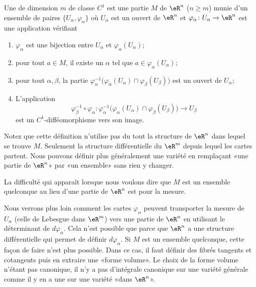 \begin{definition}
    Une  de dimension \( m\) de classe \( C^1\) est une partie \( M\) de \( \eR^n\) (\( n\geq m\)) munie d'un ensemble de paires \( \{ U_{\alpha},\varphi_{\alpha} \}\) où \( U_{\alpha}\) est un ouvert de \( \eR^n\) et \( \varphi_{\alpha}\colon U_{\alpha}\to \eR^n\) est une application vérifiant
    \begin{enumerate}
        \item
            \( \varphi_{\alpha}\) est une bijection entre \( U_{\alpha}\) et \( \varphi_{\alpha}(U_{\alpha})\);
        \item
            pour tout \( a\in M\), il existe un \( \alpha\) tel que \( a\in\varphi_{\alpha}(U_{\alpha})\);
        \item
            pour tout \( \alpha,\beta\), la partie \( \varphi_{\alpha}^{-1}\big( \varphi_{\alpha}(U_{\alpha})\cap \varphi_{\beta}(U_{\beta}) \big)\) est un ouvert de \( U_{\alpha}\);
        \item
            L'application
            \begin{equation}
                \varphi_{\beta}^{-1}\circ \varphi_{\alpha}\colon \varphi_{\alpha}^{-1}\big( \varphi_{\alpha}(U_{\alpha})\cap \varphi_{\beta}(U_{\beta}) \big)\to U_{\beta}
            \end{equation}
            est un \( C^1\)-difféomorphisme vers son image.
    \end{enumerate}
\end{definition}

Notez que cette définition n'utilise pas du tout la structure de \( \eR^n\) dans lequel se trouve \( M\). Seulement la structure différentielle du \( \eR^m\) depuis lequel les cartes partent. Nous pouvons définir plus généralement une variété en remplaçant «une partie de \( \eR^n\)» par «un ensemble» sans rien y changer.

La difficulté qui apparaît lorsque nous voulons dire que \( M\) est un ensemble quelconque au lieu d'une partie de \( \eR^n\) est pour la mesure.

Nous verrons plus loin comment les cartes \( \varphi_{\alpha}\) peuvent transporter la mesure de \( U_{\alpha}\) (celle de Lebesgue dans \( \eR^m\)) vers une partie de \( \eR^n\) en utilisant le déterminant de \( d\varphi_{\alpha}\). Cela n'est possible que parce que \( \eR^n\) a une structure différentielle qui permet de définir \( d\varphi_{\alpha}\). Si \( M\) est un ensemble quelconque, cette façon de faire n'est plus possible. Dans ce cas, il faut définir des fibrés tangents et cotangents puis en extraire une «forme volume». Le choix de la forme volume n'étant pas canonique, il n'y a pas d'intégrale canonique sur une variété générale comme il y en a une sur une variété «dans \( \eR^n\)».

